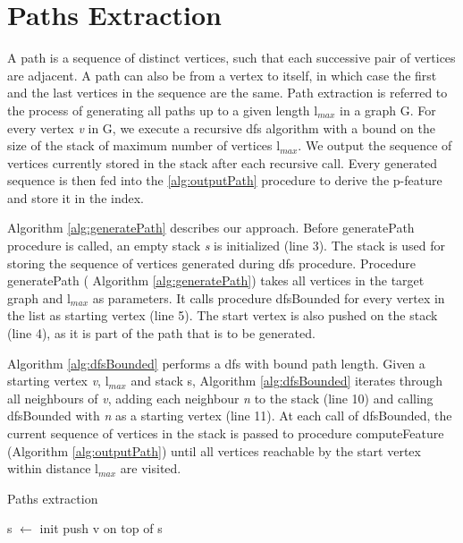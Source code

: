 \documentclass{l4proj}
\begin{document}
\section{Paths Extraction}
\label{sec:pathsExtraction}
A path is a sequence of distinct vertices, such that each successive pair of vertices are adjacent. A path can also be from a vertex to itself, in which case the first and the last vertices in the sequence are the same. Path extraction is referred to the process of generating all paths up to a given length l$_{max}$ in a graph G. For every vertex \emph{v} in G, we execute a recursive \gls{dfs} algorithm with a bound on the size of the stack of maximum number of vertices l$_{max}$. We output the sequence of vertices currently stored in the stack after each recursive call. Every generated sequence is then fed into the \ref{alg:outputPath} procedure to derive the p-feature and store it in the index.

Algorithm \ref{alg:generatePath} describes our approach. Before generatePath procedure is called, an empty stack \emph{s} is initialized (line 3). The stack is used for storing the sequence of vertices generated during \gls{dfs} procedure. Procedure generatePath ( \textrm{Algorithm \ref{alg:generatePath}}) takes all vertices in the target graph and l$_{max}$ as parameters. It calls procedure dfsBounded for every vertex in the list as starting vertex (line 5). The start vertex is also pushed on the stack (line 4), as it is part of the path that is to be generated.

Algorithm \ref{alg:dfsBounded} performs a \gls{dfs} with bound path length. Given a starting vertex \emph{v}, l$_{max}$ and stack s, Algorithm \ref{alg:dfsBounded} iterates through all neighbours of \emph{v}, adding each neighbour \emph{n} to the stack (line 10) and calling dfsBounded with \emph{n} as a starting vertex (line 11). At each call of dfsBounded, the current sequence of vertices in the stack is passed to procedure computeFeature (Algorithm \ref{alg:outputPath}) until all vertices reachable by the start vertex within distance l$_{max}$ are visited.

\begin{algorithm}
\centering
\caption{Paths extraction}
\label{alg:generatePath}
\begin{algorithmic}[1]
	\State s $\gets$ init 
	\State push v on top of s
	\State {}
\EndFor
\EndProcedure
\end{algorithmic}
\end{algorithm}
\end{document}
